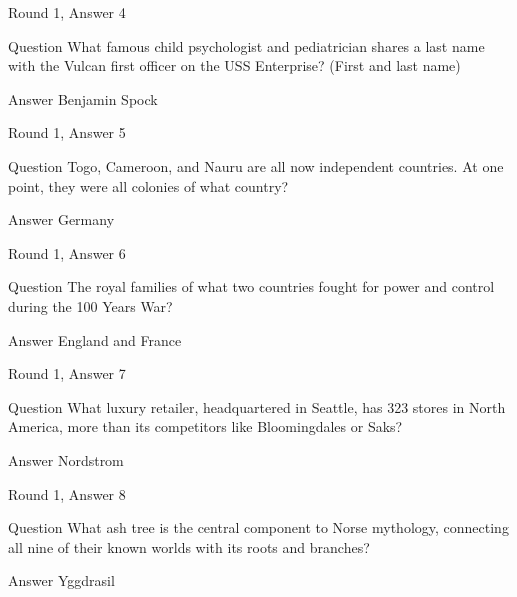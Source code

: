 \documentclass[11pt]{beamer}
\begin{document}
\begin{frame}[t]{Round 1, Answer 4}
\vspace{2em}
\begin{block}{Question}
What famous child psychologist and pediatrician shares a last name with the Vulcan first officer on the USS Enterprise? (First and last name)
\end{block}
\pause{}
\begin{block}{Answer}
Benjamin Spock
\end{block}
\end{frame}
    

\begin{frame}[t]{Round 1, Answer 5}
\vspace{2em}
\begin{block}{Question}
Togo, Cameroon, and Nauru are all now independent countries. At one point, they were all colonies of what country\@?
\end{block}
\pause{}
\begin{block}{Answer}
Germany
\end{block}
\end{frame}
    

\begin{frame}[t]{Round 1, Answer 6}
\vspace{2em}
\begin{block}{Question}
The royal families of what two countries fought for power and control during the 100 Years War\@?
\end{block}
\pause{}
\begin{block}{Answer}
England and France
\end{block}
\end{frame}
    

\begin{frame}[t]{Round 1, Answer 7}
\vspace{2em}
\begin{block}{Question}
What luxury retailer, headquartered in Seattle, has 323 stores in North America, more than its competitors like Bloomingdales or Saks\@?
\end{block}
\pause{}
\begin{block}{Answer}
Nordstrom
\end{block}
\end{frame}
    

\begin{frame}[t]{Round 1, Answer 8}
\vspace{2em}
\begin{block}{Question}
What ash tree is the central component to Norse mythology, connecting all nine of their known worlds with its roots and branches\@?
\end{block}
\pause{}
\begin{block}{Answer}
Yggdrasil
\end{block}
\end{frame}
    
\end{document}
